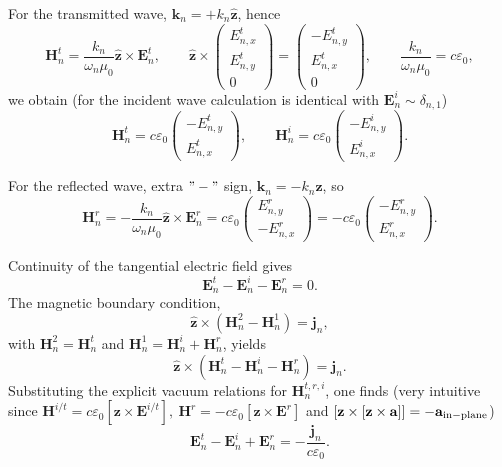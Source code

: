\documentclass[aps, prb, superscriptaddress, longbibliography]{revtex4-2}
\renewcommand{\epsilon}{\varepsilon}
\numberwithin{equation}{section}
\begin{document}
For the transmitted wave, \(\mathbf k_n=+k_n\hat{\mathbf z}\), hence
\begin{equation}
\mathbf H_n^t=\frac{k_n}{\omega_n\mu_0}\hat{\mathbf z}\times \mathbf E_n^t, \qquad \hat{\mathbf z}\times\begin{pmatrix}E_{n,x}^t\\ E_{n,y}^t\\ 0\end{pmatrix}=\begin{pmatrix}- E_{n,y}^t\\ E_{n,x}^t\\ 0\end{pmatrix},\qquad\frac{k_n}{\omega_n\mu_0}=c\epsilon_0,
\end{equation}
we obtain (for the incident wave calculation is identical with $\mathbf{E}^i_n\sim \delta_{n,1}$)
\begin{equation}
\mathbf H_n^t=c\epsilon_0\begin{pmatrix}- E_{n,y}^t\\ E_{n,x}^t\end{pmatrix},\qquad \mathbf H_n^i=c\epsilon_0\begin{pmatrix}- E_{n,y}^i\\ E_{n,x}^i\end{pmatrix}.
\end{equation}

For the reflected wave, extra $"-"$ sign, \(\mathbf k_n=-k_n\hat{\mathbf z}\), so
\begin{equation}
\mathbf H_n^r=-\frac{k_n}{\omega_n\mu_0}\hat{\mathbf z}\times \mathbf E_n^r=c\epsilon_0\begin{pmatrix}E_{n,y}^r\\ -E_{n,x}^r\end{pmatrix}=-c\epsilon_0\begin{pmatrix}-E_{n,y}^r\\ E_{n,x}^r\end{pmatrix}.
\end{equation}


Continuity of the tangential electric field gives
\begin{equation}\label{continuity}
\boxed{\mathbf E_n^t-\mathbf E_n^i-\mathbf E_n^r=0.}
\end{equation}
The magnetic boundary condition,
\begin{equation}
\hat{\mathbf z}\times(\mathbf H_n^2-\mathbf H_n^1)=\mathbf j_n,
\end{equation}
with \(\mathbf H_n^2=\mathbf H_n^t\) and \(\mathbf H_n^1=\mathbf H_n^i+\mathbf H_n^r\), yields
\begin{equation}
\hat{\mathbf z}\times(\mathbf H_n^t-\mathbf H_n^i-\mathbf H_n^r)=\mathbf j_n.
\end{equation}
Substituting the explicit vacuum relations for \(\mathbf H_n^{t,r,i}\), one finds (very intuitive since $\mathbf{H}^{i/t} = c\varepsilon_0 [\mathbf{z}\times \mathbf{E}^{i/t}], ~\mathbf{H}^{r} = -c\varepsilon_0 [\mathbf{z}\times \mathbf{E}^{r}]$ and $[\mathbf{z}\times[\mathbf{z}\times \mathbf{a}]]=-\mathbf{a}_{\rm in-plane}$)
\begin{equation}
\boxed{\mathbf E_n^t-\mathbf E_n^i+\mathbf E_n^r=-\frac{\mathbf j_n}{c\epsilon_0}.}
\end{equation}
\end{document}
